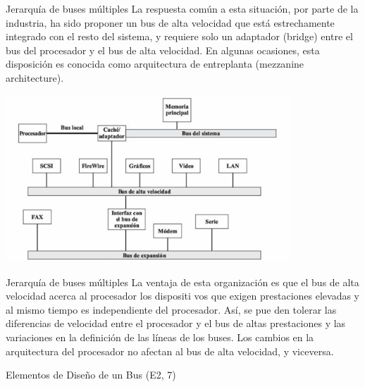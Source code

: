 \documentclass[presentation]{beamer}
\begin{document}
\begin{frame}[label={sec:orgc7ce7ce}]{Jerarquía de buses múltiples}
La respuesta común a esta
situación, por parte de la industria, ha sido proponer un bus de alta velocidad que está estrechamente
integrado con el resto del sistema, y requiere solo un adaptador (bridge) entre el bus del procesador y
el bus de alta velocidad. En algunas ocasiones, esta disposición es conocida como arquitectura de
entreplanta (mezzanine architecture).

\begin{center}
\includegraphics[width=0.8\textwidth]{./Images/jerarquiaBuses2.jpeg}
\end{center}
\end{frame}

\begin{frame}[label={sec:orgd104d9f}]{Jerarquía de buses múltiples}
La ventaja de esta organización es que el bus de alta velocidad acerca al procesador los dispositi
vos que exigen prestaciones elevadas y al mismo tiempo es independiente del procesador. Así, se pue
den tolerar las diferencias de velocidad entre el procesador y el bus de altas prestaciones y las
variaciones en la definición de las líneas de los buses. Los cambios en la arquitectura del procesador
no afectan al bus de alta velocidad, y viceversa.
\end{frame}
\begin{frame}[label={sec:org47502e5}]{Elementos de Diseño de un Bus (E2, 7)}
\end{frame}
\end{document}
